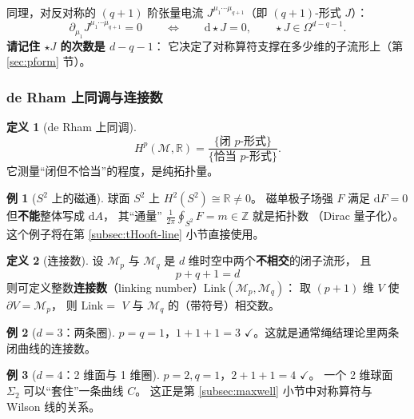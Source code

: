 \documentclass[UTF8,a4paper,11pt]{ctexart}
\theoremstyle{plain}
\theoremstyle{definition}
\newtheorem{definition}{定义}[section]
\newtheorem{example}{例}[section]
\theoremstyle{remark}
\newcommand{\ext}{\mathrm{d}}          %
\newcommand{\hs}{\star}                %
\newcommand{\Link}{\mathrm{Link}}
\newcommand{\ZZ}{\mathbb{Z}}
\newcommand{\RR}{\mathbb{R}}
\newcommand{\Mfd}{\mathcal{M}}
\newcommand{\Ssurf}{\Sigma}
\newcommand{\en}[1]{\textsf{#1}}       %
\begin{document}
同理，对反对称的 $(q+1)$ 阶张量电流
$J^{\mu_1\cdots\mu_{q+1}}$（即 $(q+1)$-形式 $J$）：
\begin{equation}
  \partial_{\mu_1}J^{\mu_1\cdots\mu_{q+1}}=0
  \qquad\Longleftrightarrow\qquad
  \ext\hs J=0 ,
  \qquad
  \hs J\in\Omega^{d-q-1} .
  \label{eq:conservation-q}
\end{equation}
\textbf{请记住 $\hs J$ 的次数是 $d-q-1$}：
它决定了对称算符支撑在多少维的子流形上（第 \ref{sec:pform} 节）。

\subsubsection{de Rham 上同调与连接数}

\begin{definition}[de Rham 上同调]
\begin{equation}
  H^p(\Mfd,\RR)
  =\frac{\{\text{闭 }p\text{-形式}\}}{\{\text{恰当 }p\text{-形式}\}} .
  \label{eq:deRham}
\end{equation}
它测量“闭但不恰当”的程度，是纯拓扑量。
\end{definition}

\begin{example}[$S^2$ 上的磁通]
球面 $S^2$ 上 $H^2(S^2)\cong\RR\ne0$。
磁单极子场强 $F$ 满足 $\ext F=0$ 但\textbf{不能}整体写成 $\ext A$，
其“通量” $\frac{1}{2\pi}\oint_{S^2}F=m\in\ZZ$ 就是拓扑数
（Dirac 量子化）。这个例子将在第 \ref{subsec:tHooft-line} 小节直接使用。
\end{example}

\begin{definition}[连接数]
\label{def:link}
设 $\Mfd_p$ 与 $\Mfd_q$ 是 $d$ 维时空中两个\textbf{不相交}的闭子流形，
且
\begin{equation}
  \boxed{\ p+q+1=d\ }
  \label{eq:linkdim}
\end{equation}
则可定义整数\textbf{连接数}（\en{linking number}）$\Link(\Mfd_p,\Mfd_q)$：
取 $(p+1)$ 维 $V$ 使 $\partial V=\Mfd_p$，
则 $\Link=$ $V$ 与 $\Mfd_q$ 的（带符号）相交数。
\end{definition}

\begin{example}[$d=3$：两条圈]
$p=q=1$，$1+1+1=3$ $\checkmark$。这就是通常绳结理论里两条闭曲线的连接数。
\end{example}

\begin{example}[$d=4$：2 维面与 1 维圈]
$p=2,q=1$，$2+1+1=4$ $\checkmark$。
一个 2 维球面 $\Ssurf_2$ 可以“套住”一条曲线 $C$。
这正是第 \ref{subsec:maxwell} 小节中对称算符与 Wilson 线的关系。
\end{example}
\end{document}
